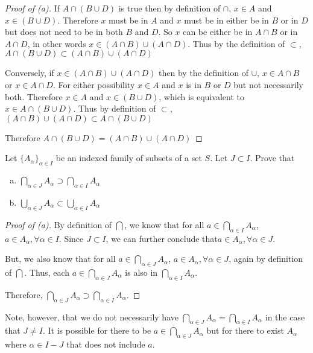 \begin{proof}[Proof of (a)]
	If $A \cap (B \cup D)$ is true then by definition of $\cap$, $x \in A$ and $x \in (B \cup D)$. Therefore $x$ must be in $A$ and $x$ must be in either
	be in $B$ or in $D$ but does not need to be in both $B$ and $D$. So $x$ can be either be in $A \cap B$ or in $A \cap D$, in other words $ x \in (A \cap B) \cup (A \cap D)$.
	Thus by the definition of $\subset$, $A \cap (B \cup D) \subset (A \cap B) \cup (A \cap D)$

	Conversely, if $x \in (A \cap B) \cup (A \cap D)$ then by the definition of $\cup$, $x \in A \cap B$ or $x \in A \cap D$. For either possibility $x \in A$ and $x$ is in
	$B$ or $D$ but not necessarily both. Therefore $x \in A$ and $x \in (B \cup D)$, which is equivalent to $x \in A \cap (B \cup D)$. Thus by definition of $\subset$,
	$(A \cap B) \cup (A \cap D) \subset A \cap (B \cup D)$

	Therefore $A \cap (B \cup D) = (A \cap B) \cup (A \cap D)$
\end{proof}

\begin{problem}[3]
	Let $\{A_\alpha\}_{\alpha \in I}$ be an indexed family of subsets of a set $S$. Let $J \subset I$. Prove that
	\begin{enumerate}[(a)]
		\item $\bigcap_{\alpha \in J} A_\alpha \supset \bigcap_{\alpha \in I} A_\alpha$
		\item $\bigcup_{\alpha \in J} A_\alpha \subset \bigcup_{\alpha \in I} A_\alpha$
	\end{enumerate}
\end{problem}


\begin{proof}[Proof of (a)]
	By definition of $\bigcap$, we know that for all $a \in \bigcap_{\alpha \in I} A_\alpha$, $a \in A_\alpha, \forall \alpha \in I$.
	Since $J \subset I$, we can further conclude that$a \in A_\alpha, \forall \alpha \in J$.

	But, we also know that for all $a \in \bigcap_{\alpha \in J} A_\alpha$, $a \in A_\alpha, \forall \alpha \in J$, again by definition of $\bigcap$.
	Thus, each $a \in \bigcap_{\alpha \in J} A_\alpha$ is also in $\bigcap_{\alpha \in I} A_\alpha$.

	Therefore, $\bigcap_{\alpha \in J} A_\alpha \supset \bigcap_{\alpha \in I} A_\alpha$.
\end{proof}

Note, however, that we do not necessarily have $\bigcap_{\alpha \in J} A_\alpha = \bigcap_{\alpha \in I} A_\alpha$ in the case that $J \neq I$.
It is possible for there to be $a \in \bigcap_{\alpha \in J} A_\alpha$ but for there to exist $A_\alpha$ where $\alpha \in I - J$ that does not include $a$.

